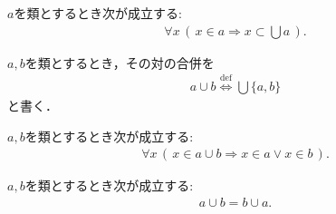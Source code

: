	\begin{screen}
		\begin{thm}[合併は任意の要素より大きい]\label{thm:union_is_bigger_than_any_member}
			$a$を類とするとき次が成立する:
			\begin{align}
				\forall x\, (\, x \in a \Longrightarrow x \subset \bigcup a\, ).
			\end{align}
		\end{thm}
	\end{screen}
	
	$a,b$を類とするとき，その対の合併を
	\begin{align}
		a \cup b \overset{\mathrm{def}}{\Longleftrightarrow} \bigcup \{a,b\}
	\end{align}
	と書く．
	
	\begin{screen}
		\begin{thm}
			$a,b$を類とするとき次が成立する:
			\begin{align}
				\forall x\, (\, x \in a \cup b \Longrightarrow x \in a \vee x \in b\, ).
			\end{align}
		\end{thm}
	\end{screen}
	
	\begin{screen}
		\begin{thm}[合併の可換律]
			$a,b$を類とするとき次が成立する:
			\begin{align}
				a \cup b = b \cup a.
			\end{align}
		\end{thm}
	\end{screen}